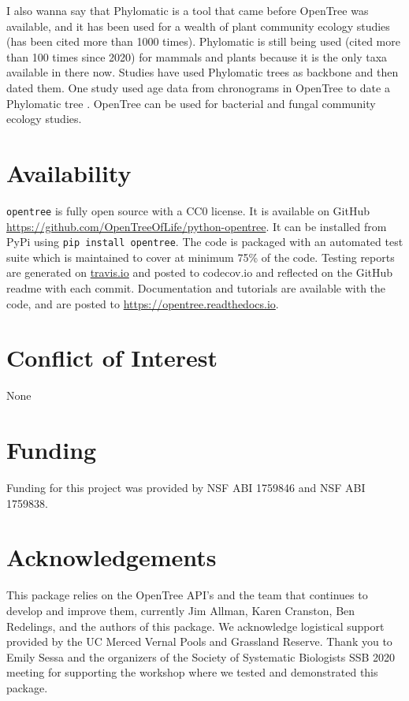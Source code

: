 \documentclass[oupdraft]{sysbio_sse}
\begin{document}
I also wanna say that Phylomatic \citep{webb2005phylomatic} is a tool that came before
OpenTree was available, and it has been used for a wealth of plant community ecology
studies (has been cited more than 1000 times).
Phylomatic is still being used (cited more than 100 times since 2020) for mammals
and plants because it is the only taxa available in there now.
Studies have used Phylomatic trees as backbone and then dated them. One study used
age data from chronograms in OpenTree to date a Phylomatic tree \citep{}.
OpenTree can be used for bacterial and fungal community ecology studies.





\section{Availability}
\label{sec6}

\texttt{opentree} is fully open source with a CC0 license. It is available on GitHub \url{ https://github.com/OpenTreeOfLife/python-opentree}. It can be installed from PyPi using \texttt{pip install opentree}. The code is packaged with an automated test suite which is maintained to cover at minimum 75\% of the code. Testing reports are generated on \url{travis.io} and posted to {codecov.io} and reflected on the GitHub readme with each commit. Documentation and tutorials are available with the code, and are posted to \url{https://opentree.readthedocs.io}.


\section{Conflict of Interest}
None

\section{Funding}
Funding for this project was provided by NSF ABI 1759846 and NSF ABI 1759838.

\section{Acknowledgements}
This package relies on the OpenTree API's and the team that continues to develop and improve them, currently Jim Allman, Karen Cranston, Ben Redelings, and the authors of this package. We acknowledge logistical support provided by the UC Merced Vernal Pools and Grassland Reserve.
Thank you to Emily Sessa and the organizers of the Society of Systematic Biologists SSB 2020 meeting for supporting the workshop where we tested and demonstrated this package.
\end{document}
